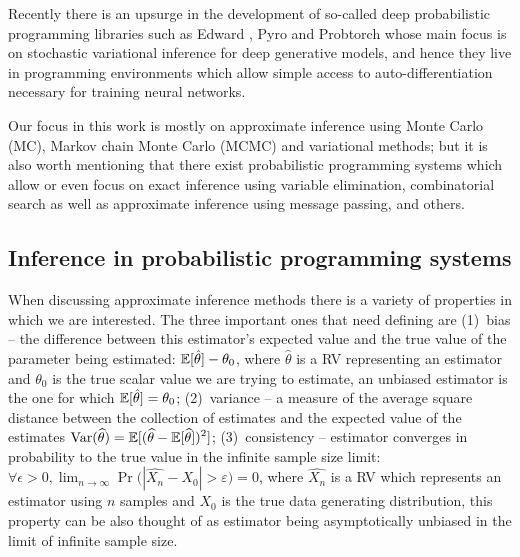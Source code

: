 \documentclass[12pt]{article}
\begin{document}
Recently there is an upsurge in the development of so-called deep probabilistic programming libraries such as Edward \citep{TranEtAl2016}, Pyro \citep{Pyro2018} and Probtorch \citep{Siddharth2017} whose main focus is on stochastic variational inference for deep generative models, and hence they live in programming environments which allow simple access to auto-differentiation necessary for training neural networks.

Our focus in this work is mostly on approximate inference using Monte Carlo (MC), Markov chain Monte Carlo (MCMC) and variational methods; but it is also worth mentioning that there exist probabilistic programming systems which allow or even focus on exact inference using variable elimination, combinatorial search as well as approximate inference using message passing, and others.




\subsection{Inference in probabilistic programming systems}
\label{sec:inference-prob-prog}

When discussing approximate inference methods there is a variety of properties in which we are interested.
The three important ones that need defining are 
(1)~bias -- the difference between this estimator's expected value and the true value of the parameter being estimated: 
$\mathbb{E} [\hat{\theta}] - \theta_0$, 
where $\hat{\theta}$ is a RV representing an estimator and $\theta_0$ is the true scalar value we are trying to estimate,
an unbiased estimator is the one for which $\mathbb{E} [\hat{\theta}] = \theta_0$;
(2)~variance -- a measure of the average square distance between the collection of estimates and the expected value of the estimates
${\displaystyle \operatorname {Var} ({\widehat {\theta }})=\mathbb{E} [({\widehat {\theta }}-\mathbb{E} [{\widehat {\theta }}])^{2}]}$;
(3)~consistency -- estimator converges in probability to the true value in the infinite sample size limit: 
$\forall \epsilon>0, \lim _{n\to \infty}\Pr {\big (}|\hat{X_{n}}-X_0| > \varepsilon {\big )}=0$, 
where $\hat{X_n}$ is a RV which represents an estimator using $n$ samples and $X_0$ is the true data generating distribution,
this property can be also thought of as estimator being asymptotically unbiased in the limit of infinite sample size.
\end{document}
